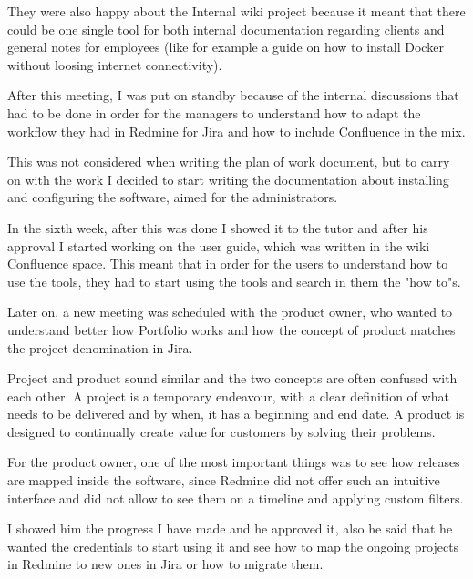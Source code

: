 	They were also happy about the Internal wiki project because it meant that there could be one single tool for both internal documentation regarding clients and general notes for employees (like for example a guide on how to install Docker without loosing internet connectivity).
	
	After this meeting, I was put on standby because of the internal discussions that had to be done in order for the managers to understand how to adapt the workflow they had in Redmine for Jira and how to include Confluence in the mix.
	
	This was not considered when writing the plan of work document, but to carry on with the work I decided to start writing the documentation about installing and configuring the software, aimed for the administrators.
	
	In the sixth week, after this was done I showed it to the tutor and after his approval I started working on the user guide, which was written in the wiki Confluence space.
	This meant that in order for the users to understand how to use the tools, they had to start using the tools and search in them the "how to"s.
	
	
	Later on, a new meeting was scheduled with the product owner, who wanted to understand better how Portfolio works and how the concept of product matches the project denomination in Jira.
	
	Project and product sound similar and the two concepts are often confused with each other.
	A project is a temporary endeavour, with a clear definition of what needs to be delivered and by when, it has a beginning and end date.
	A product is designed to continually create value for customers by solving their problems.
	
	For the product owner, one of the most important things was to see how releases are mapped inside the software, since Redmine did not offer such an intuitive interface and did not allow to see them on a timeline and applying custom filters.
	
	I showed him the progress I have made and he approved it, also he said that he wanted the credentials to start using it and see how to map the ongoing projects in Redmine to new ones in Jira or how to migrate them.
	
